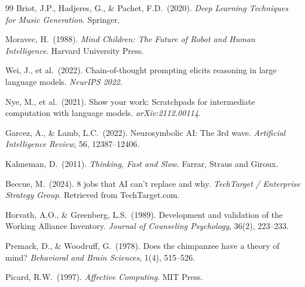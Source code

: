 \documentclass[12pt]{article}
\begin{document}
\begin{thebibliography}{99}
 Briot, J.P., Hadjeres, G., \& Pachet, F.D.\ (2020). \textit{Deep Learning Techniques for Music Generation}. Springer.

 Moravec, H.\ (1988). \textit{Mind Children: The Future of Robot and Human Intelligence}. Harvard University Press.

 Wei, J., et al.\ (2022). Chain-of-thought prompting elicits reasoning in large language models. \textit{NeurIPS 2022}.

 Nye, M., et al.\ (2021). Show your work: Scratchpads for intermediate computation with language models. \textit{arXiv:2112.00114}.

 Garcez, A., \& Lamb, L.C.\ (2022). Neurosymbolic AI: The 3rd wave. \textit{Artificial Intelligence Review}, 56, 12387--12406.

 Kahneman, D.\ (2011). \textit{Thinking, Fast and Slow}. Farrar, Straus and Giroux.

 Beccue, M.\ (2024). 8 jobs that AI can't replace and why. \textit{TechTarget / Enterprise Strategy Group}. Retrieved from TechTarget.com.


 Horvath, A.O., \& Greenberg, L.S.\ (1989). Development and validation of the Working Alliance Inventory. \textit{Journal of Counseling Psychology}, 36(2), 223--233.

 Premack, D., \& Woodruff, G.\ (1978). Does the chimpanzee have a theory of mind? \textit{Behavioral and Brain Sciences}, 1(4), 515--526.

 Picard, R.W.\ (1997). \textit{Affective Computing}. MIT Press.

\end{thebibliography}
\end{document}
